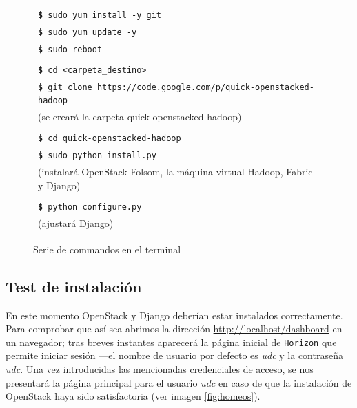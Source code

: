 \begin{figure}[tbp]
 \begin{center}
  \begin{tabular}{|l|}
   \hline
   \texttt{{\bf \$} sudo yum install -y git} \\
   \texttt{{\bf \$} sudo yum update -y} \\
   \texttt{{\bf \$} sudo reboot} \\ \\
   \texttt{{\bf \$} cd <carpeta\_destino>} \\
   \texttt{{\bf \$} git clone https://code.google.com/p/quick-openstacked-hadoop} \\
   (se crear\'a la carpeta quick-openstacked-hadoop) \\ \\
   \texttt{{\bf \$} cd quick-openstacked-hadoop} \\
   \texttt{{\bf \$} sudo python install.py} \\
   (instalar\'a OpenStack Folsom, la m\'aquina virtual Hadoop, Fabric y Django) \\ \\
   \texttt{{\bf \$} python configure.py} \\
   (ajustar\'a Django) \\
   \hline
  \end{tabular}
  \caption{Serie de commandos en el terminal}
  \label{fig:comandosshell}
 \end{center}
\end{figure}

\subsection{Test de instalaci\'on}\label{subsec:testejecucion}
\noindent En este momento OpenStack y Django deber\'ian estar instalados correctamente. Para comprobar que as\'i sea abrimos la direcci\'on \url{http://localhost/dashboard} en un navegador; tras breves instantes aparecer\'a la p\'agina inicial de \texttt{Horizon} que permite iniciar sesi\'on ---el nombre de usuario por defecto es \emph{udc} y la contrase\~na \emph{udc}. Una vez introducidas las mencionadas credenciales de acceso, se nos presentar\'a la p\'agina principal para el usuario \emph{udc} en caso de que la instalaci\'on de OpenStack haya sido satisfactoria (ver imagen \ref{fig:homeos}).\newline

